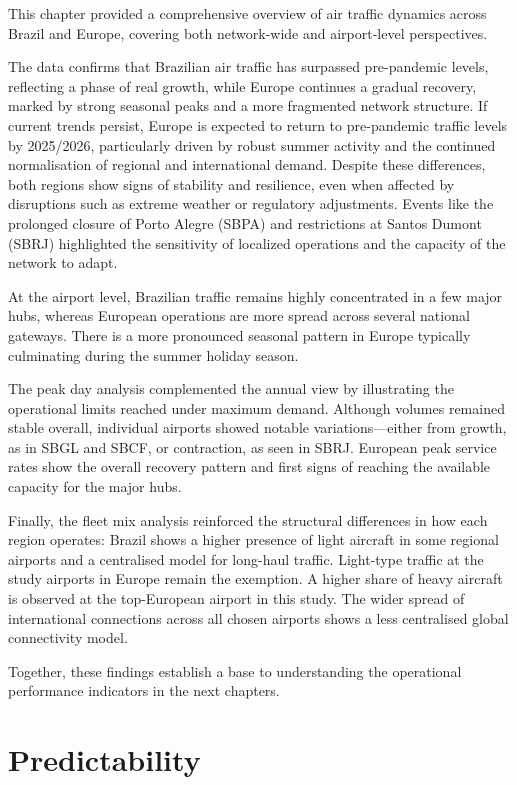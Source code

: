 \documentclass[
  a4paper,
  DIV=11,
  numbers=noendperiod]{scrreport}
\begin{document}
This chapter provided a comprehensive overview of air traffic dynamics
across Brazil and Europe, covering both network-wide and airport-level
perspectives.

The data confirms that Brazilian air traffic has surpassed pre-pandemic
levels, reflecting a phase of real growth, while Europe continues a
gradual recovery, marked by strong seasonal peaks and a more fragmented
network structure. If current trends persist, Europe is expected to
return to pre-pandemic traffic levels by 2025/2026, particularly driven
by robust summer activity and the continued normalisation of regional
and international demand. Despite these differences, both regions show
signs of stability and resilience, even when affected by disruptions
such as extreme weather or regulatory adjustments. Events like the
prolonged closure of Porto Alegre (SBPA) and restrictions at Santos
Dumont (SBRJ) highlighted the sensitivity of localized operations and
the capacity of the network to adapt.

At the airport level, Brazilian traffic remains highly concentrated in a
few major hubs, whereas European operations are more spread across
several national gateways. There is a more pronounced seasonal pattern
in Europe typically culminating during the summer holiday season.

The peak day analysis complemented the annual view by illustrating the
operational limits reached under maximum demand. Although volumes
remained stable overall, individual airports showed notable
variations---either from growth, as in SBGL and SBCF, or contraction, as
seen in SBRJ. European peak service rates show the overall recovery
pattern and first signs of reaching the available capacity for the major
hubs.

Finally, the fleet mix analysis reinforced the structural differences in
how each region operates: Brazil shows a higher presence of light
aircraft in some regional airports and a centralised model for long-haul
traffic. Light-type traffic at the study airports in Europe remain the
exemption. A higher share of heavy aircraft is observed at the
top-European airport in this study. The wider spread of international
connections across all chosen airports shows a less centralised global
connectivity model.

Together, these findings establish a base to understanding the
operational performance indicators in the next chapters.


\chapter{Predictability}\label{predictability}
\end{document}
